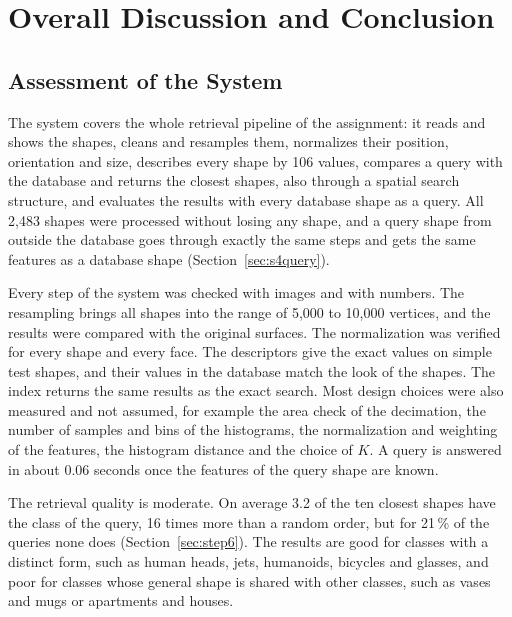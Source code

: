 \documentclass[10pt,a4paper]{article}
\begin{document}
\section{Overall Discussion and Conclusion}\label{sec:overall}

\subsection{Assessment of the System}
The system covers the whole retrieval pipeline of the assignment: it reads and shows the shapes, cleans and resamples them,
normalizes their position, orientation and size, describes every shape by 106 values, compares a query with the database and
returns the closest shapes, also through a spatial search structure, and evaluates the results with every database shape as a
query. All 2,483 shapes were processed without losing any shape, and a query shape from outside the database goes through
exactly the same steps and gets the same features as a database shape (Section~\ref{sec:s4query}).

Every step of the system was checked with images and with numbers. The resampling brings all shapes into the range of 5,000 to
10,000 vertices, and the results were compared with the original surfaces. The normalization was verified for every shape and
every face. The descriptors give the exact values on simple test shapes, and their values in the database match the look of the
shapes. The index returns the same results as the exact search. Most design choices were also measured and not assumed, for
example the area check of the decimation, the number of samples and bins of the histograms, the normalization and weighting of
the features, the histogram distance and the choice of $K$. A query is answered in about 0.06
seconds once the features of the query shape are known.

The retrieval quality is moderate. On average 3.2 of the ten closest shapes have the class of the query, 16 times more than a
random order, but for 21\,\% of the queries none does (Section~\ref{sec:step6}). The results are good for classes with a
distinct form, such as human heads, jets, humanoids, bicycles and glasses, and poor for classes whose general shape is
shared with other classes, such as vases and mugs or apartments and houses.
\end{document}
